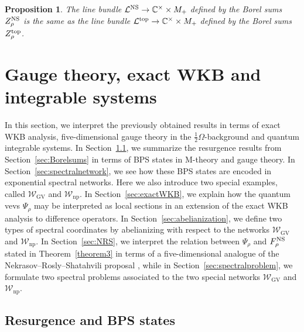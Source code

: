 \documentclass[pdftex]{sigma}
\numberwithin{equation}{section}
\newtheorem{Proposition}[Theorem]{Proposition}
 { \theoremstyle{definition}
\newtheorem{Definition}[Theorem]{Definition}
\newtheorem{Note}[Theorem]{Note}
\newtheorem{Example}[Theorem]{Example}
\newtheorem{Remark}[Theorem]{Remark} }
\begin{document}
\begin{Proposition}
The line bundle $\mathcal{L}^{\rm NS}\to \mathbb{C}^{\times}\times M_+$ defined by the Borel sums $Z_{\rho}^{\rm NS}$ is the same as the line bundle $\mathcal{L}^{{\rm top}}\to \mathbb{C}^{\times}\times M_+$ defined by the Borel sums $Z_{\rho}^{{\rm top}}$.
\end{Proposition}

\section{Gauge theory, exact WKB and integrable systems}\label{5dWKBsec}

In this section, we interpret the previously obtained results in terms of exact WKB analysis, five-dimensional gauge theory in the $\frac{1}{2}\Omega$-background and quantum integrable systems. In Section~\ref{sec:BPS}, we summarize the resurgence results from Section~\ref{sec:Borelsums} in terms of BPS states in M-theory and gauge theory. In Section~\ref{sec:spectralnetwork}, we see how these BPS states are encoded in exponential spectral networks. Here we also introduce two special examples, called $\mathcal{W}_\mathrm{GV}$ and $\mathcal{W}_\mathrm{np}$. In Section~\ref{sec:exactWKB}, we explain how the quantum vevs $\Psi_\rho$ may be interpreted as local sections in an extension of the exact WKB analysis to difference operators. In Section~\ref{sec:abelianization}, we define two types of spectral coordinates by abelianizing with respect to the networks $\mathcal{W}_\mathrm{GV}$ and $\mathcal{W}_\mathrm{np}$. In Section~\ref{sec:NRS}, we interpret the relation between $\Psi_\rho$ and $F^{\rm NS}_\rho$ stated in Theorem~\ref{theorem3} in terms of a five-dimensional analogue of the Nekrasov--Rosly--Shatahvili proposal \cite{Nekrasov:NRS}, while in Section~\ref{sec:spectralproblem}, we formulate two spectral problems associated to the two special networks $\mathcal{W}_\mathrm{GV}$ and $\mathcal{W}_\mathrm{np}$.

\subsection{Resurgence and BPS states}\label{sec:BPS}
\end{document}

